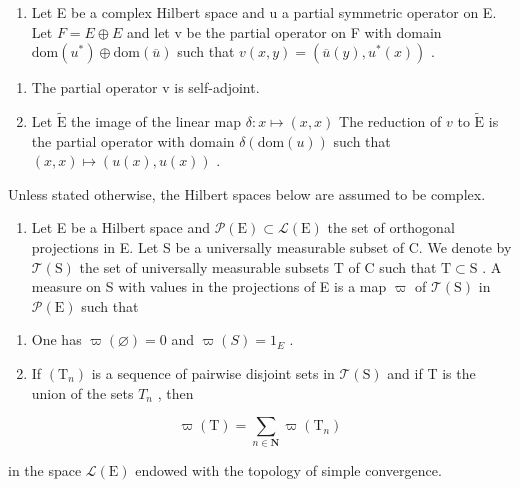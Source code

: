 \begin{enumerate}
\def\labelenumi{\arabic{enumi})}
\setcounter{enumi}{23}
\tightlist
\item
  Let E be a complex Hilbert space and u a partial symmetric operator on E. Let \(F = E \oplus E\) and let v be the partial operator on F with domain \(\text{dom}(u^{*}) \oplus \text{dom}(\overline{u})\) such that \(v(x, y) = (\overline{u}(y), u^{*}(x))\) .
\end{enumerate}

\begin{enumerate}
\def\labelenumi{\alph{enumi})}
\item
  The partial operator v is self-adjoint.
\item
  Let \(\widetilde{\mathrm{E}}\) the image of the linear map \(\delta\colon x\mapsto(x,x)\) The reduction of \(v\) to \(\widetilde{\mathrm{E}}\) is the partial operator with domain \(\delta(\mathrm{dom}(u))\) such that \((x,x)\mapsto(u(x),u(x))\) .
\end{enumerate}

\exercisesection{}

Unless stated otherwise, the Hilbert spaces below are assumed to be complex.

\begin{enumerate}
\def\labelenumi{\arabic{enumi})}
\tightlist
\item
  Let E be a Hilbert space and \(\mathcal{P}(\mathrm{E})\subset \mathcal{L}(\mathrm{E})\) the set of orthogonal projections in E. Let S be a universally measurable subset of C. We denote by \(\mathcal{T}(\mathrm{S})\) the set of universally measurable subsets T of C such that \(\mathrm{T}\subset \mathrm{S}\) . A measure on S with values in the projections of E is a map \(\varpi\) of \(\mathcal{T}(\mathrm{S})\) in \(\mathcal{P}(\mathrm{E})\) such that
\end{enumerate}

\begin{enumerate}
\def\labelenumi{(\roman{enumi})}
\item
  One has \(\varpi(\varnothing)=0\) and \(\varpi(S)=1_{E}\) .
\item
  If \((\mathrm{T}_{n})\) is a sequence of pairwise disjoint sets in \(\mathcal{T}(\mathrm{S})\) and if T is the union of the sets \(T_{n}\) , then
\end{enumerate}

\[
\varpi (\mathrm{T}) = \sum_ {n \in \mathbf {N}} \varpi (\mathrm{T} _ {n})
\]

in the space \(\mathcal{L}(\mathrm{E})\) endowed with the topology of simple convergence.

